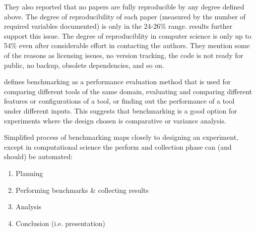 They also reported that no papers are fully reproducible by any degree defined above.
The degree of reproducibility of each paper (measured by the number of required variables documented) is only in the 24-26\% range.
\citet{collbergRepeatabilityComputerSystems2016} results further support this issue.
The degree of reproduciblity in computer science is only up to 54\% even after considerable effort in contacting the authors.
They mention some of the reasons as licensing issues, no version tracking, the code is not ready for public, no backup, obsolete dependencies, and so on.

\citet{beyerReliableBenchmarkingRequirements2019} defines benchmarking as a performance evaluation method that is used for comparing different tools of the same domain, evaluating and comparing different features or configurations of a tool, or finding out the performance of a tool under different inputs.
This suggests that benchmarking is a good option for experiments where the design chosen is comparative or variance analysis.

Simplified process of benchmarking maps closely to designing an experiment, except in computational science the perform and collection phase can (and should) be automated:
\begin{enumerate}[noitemsep]
	\item Planning
	\item Performing benchmarks \& collecting results
	\item Analysis
	\item Conclusion (i.e. presentation)
\end{enumerate}

